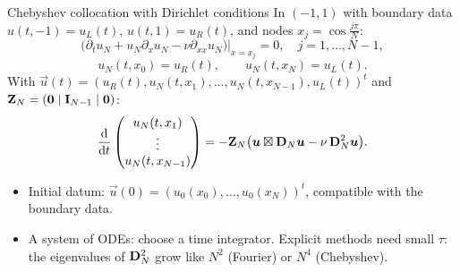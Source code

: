 \begin{frame}{Chebyshev collocation with Dirichlet conditions}
    \small
    In $(-1,1)$ with boundary data $u(t,-1) = u_L(t)$, $u(t,1) = u_R(t)$, and nodes $x_j = \cos\frac{j\pi}{N}$:
    \[
        \Big( \partial_t u_N + u_N \partial_x u_N - \nu \partial_{xx} u_N \Big)\Big|_{x = x_j} = 0, \quad j = 1, \dots, N-1,
    \]
    \[
        u_N(t, x_0) = u_R(t), \qquad u_N(t,x_N) = u_L(t).
    \]
    With $\vec u(t) = (u_R(t), u_N(t,x_1), \dots, u_N(t, x_{N-1}), u_L(t))^t$ and $\mathbf{Z}_N = (\bm{0} \mid \mathbf{I}_{N-1} \mid \bm{0})$:
    \[
        \frac{{\mathrm d}}{{\mathrm d} t}
        \begin{pmatrix} u_N(t,x_1) \\ \vdots \\ u_N(t, x_{N-1}) \end{pmatrix}
        = -\mathbf{Z}_N \big( \bm{u} \boxtimes \mathbf{D}_N \bm{u} - \nu\, \mathbf{D}_N^2 \bm{u} \big).
    \]
    \begin{itemize}
        \item Initial datum: $\vec u(0) = (u_0(x_0), \dots, u_0(x_N))^t$, compatible with the boundary data.
        \item A system of ODEs: choose a time integrator.
              Explicit methods need small $\tau$:\\ the eigenvalues of $\mathbf{D}_N^2$ grow like $N^2$ (Fourier) or $N^4$ (Chebyshev).
    \end{itemize}
\end{frame}

